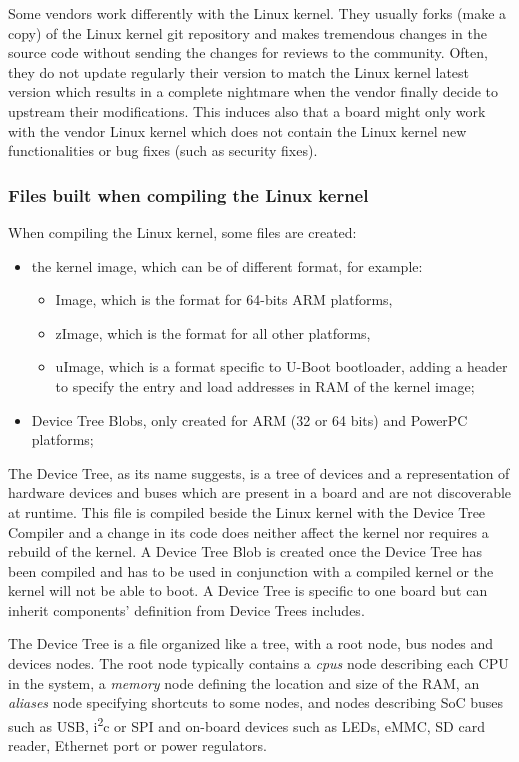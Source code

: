 Some vendors work differently with the Linux kernel. They usually forks (make a copy) of the Linux kernel git repository and makes tremendous changes in the source code without sending the changes for reviews to the community. Often, they do not update regularly their version to match the Linux kernel latest version which results in a complete nightmare when the vendor finally decide to upstream their modifications. This induces also that a board might only work with the vendor Linux kernel which does not contain the Linux kernel new functionalities or bug fixes (such as security fixes).

\subsubsection{Files built when compiling the Linux kernel}

When compiling the Linux kernel, some files are created:
\begin{itemize}
  \item the kernel image, which can be of different format, for example:

\begin{itemize}
  \item Image, which is the format for 64-bits ARM platforms,
  \item zImage, which is the format for all other platforms,
  \item uImage, which is a format specific to U-Boot bootloader, adding a header to specify the entry and load addresses in RAM of the kernel image;
\end{itemize}

  \item Device Tree Blobs, only created for ARM (32 or 64 bits) and PowerPC platforms;
\end{itemize}

The Device Tree, as its name suggests, is a tree of devices and a representation of hardware devices and buses which are present in a board and are not discoverable at runtime. This file is compiled beside the Linux kernel with the Device Tree Compiler and a change in its code does neither affect the kernel nor requires a rebuild of the kernel. A Device Tree Blob is created once the Device Tree has been compiled and has to be used in conjunction with a compiled kernel or the kernel will not be able to boot. A Device Tree is specific to one board but can inherit components' definition from Device Trees includes.

The Device Tree is a file organized like a tree, with a root node, bus nodes and devices nodes. The root node typically contains a \textit{cpus} node describing each CPU in the system, a \textit{memory} node defining the location and size of the RAM, an \textit{aliases} node specifying shortcuts to some nodes, and nodes describing SoC buses such as USB, i\textsuperscript{2}c or SPI and on-board devices such as LEDs, eMMC, SD card reader, Ethernet port or power regulators.

